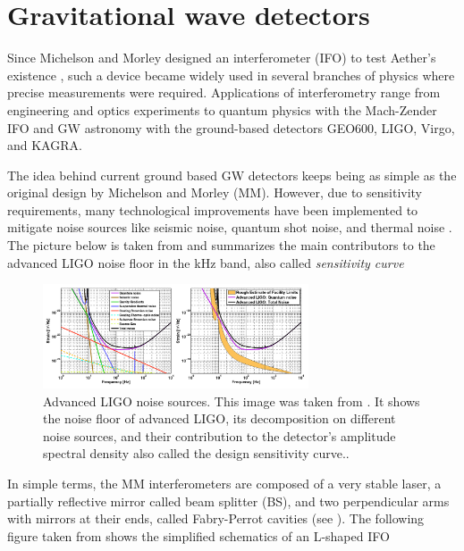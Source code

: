 \newpage
\section{Gravitational wave detectors}

Since Michelson and Morley designed an interferometer (IFO) to test Aether's existence \cite{Michelson333}, such a device became widely used in several branches of physics where precise measurements were required. Applications of interferometry range from engineering and optics experiments to quantum physics with the Mach-Zender IFO and GW astronomy with the ground-based detectors GEO600, LIGO, Virgo, and KAGRA.

The idea behind current ground based GW detectors keeps being as simple as the original design by Michelson and Morley (MM). However, due to sensitivity requirements, many technological improvements have been implemented to mitigate noise sources like seismic noise, quantum shot noise, and thermal noise \cite{LIGOScientific:2013pcc}. The picture below is taken from \cite{Hild_2012} and summarizes the main contributors to the advanced LIGO noise floor in the kHz band, also called \textit{sensitivity curve}  


\begin{figure}[hbt!]
\begin{center}
\includegraphics[width=0.7\textwidth, angle=0]{images/aligo.png}
\captionsetup{width=0.8\textwidth}
\caption[Advanced LIGO noise sources]{Advanced LIGO noise sources. This image was taken from \cite{Hild_2012}. It shows the noise floor of advanced LIGO, its decomposition on different noise sources, and their contribution to the detector's amplitude spectral density also called the design sensitivity curve..}
\label{LIGO}
\end{center}
\end{figure}
\FloatBarrier

In simple terms, the MM interferometers are composed of a very stable laser, a partially reflective mirror called beam splitter (BS), and two perpendicular arms with mirrors at their ends, called Fabry-Perrot cavities (see \cite{Saulson:1995zi}). The following figure taken from \cite{Hild_2012} shows the simplified schematics of an L-shaped IFO   


